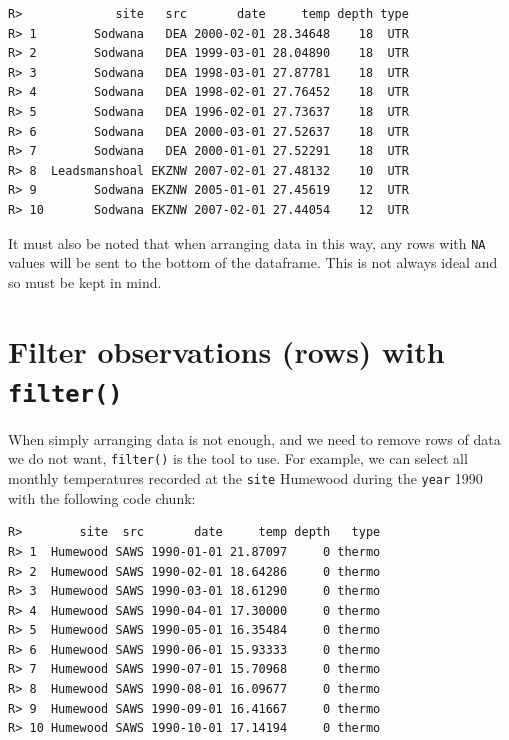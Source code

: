\documentclass[]{book}
\newenvironment{Shaded}{\begin{snugshade}}{\end{snugshade}}
\newcommand{\KeywordTok}[1]{\textcolor[rgb]{0.13,0.29,0.53}{\textbf{#1}}}
\newcommand{\DecValTok}[1]{\textcolor[rgb]{0.00,0.00,0.81}{#1}}
\newcommand{\StringTok}[1]{\textcolor[rgb]{0.31,0.60,0.02}{#1}}
\newcommand{\OperatorTok}[1]{\textcolor[rgb]{0.81,0.36,0.00}{\textbf{#1}}}
\newcommand{\NormalTok}[1]{#1}
\theoremstyle{definition}
\theoremstyle{definition}
\theoremstyle{definition}
\theoremstyle{remark}
\begin{document}
\begin{verbatim}
R>             site   src       date     temp depth type
R> 1        Sodwana   DEA 2000-02-01 28.34648    18  UTR
R> 2        Sodwana   DEA 1999-03-01 28.04890    18  UTR
R> 3        Sodwana   DEA 1998-03-01 27.87781    18  UTR
R> 4        Sodwana   DEA 1998-02-01 27.76452    18  UTR
R> 5        Sodwana   DEA 1996-02-01 27.73637    18  UTR
R> 6        Sodwana   DEA 2000-03-01 27.52637    18  UTR
R> 7        Sodwana   DEA 2000-01-01 27.52291    18  UTR
R> 8  Leadsmanshoal EKZNW 2007-02-01 27.48132    10  UTR
R> 9        Sodwana EKZNW 2005-01-01 27.45619    12  UTR
R> 10       Sodwana EKZNW 2007-02-01 27.44054    12  UTR
\end{verbatim}

It must also be noted that when arranging data in this way, any rows
with \texttt{NA} values will be sent to the bottom of the dataframe.
This is not always ideal and so must be kept in mind.

\section{\texorpdfstring{Filter observations (rows) with
\texttt{filter()}}{Filter observations (rows) with filter()}}\label{filter-observations-rows-with-filter}

When simply arranging data is not enough, and we need to remove rows of
data we do not want, \texttt{filter()} is the tool to use. For example,
we can select all monthly temperatures recorded at the \texttt{site}
Humewood during the \texttt{year} 1990 with the following code chunk:

\begin{Shaded}
\end{Shaded}

\begin{verbatim}
R>        site  src       date     temp depth   type
R> 1  Humewood SAWS 1990-01-01 21.87097     0 thermo
R> 2  Humewood SAWS 1990-02-01 18.64286     0 thermo
R> 3  Humewood SAWS 1990-03-01 18.61290     0 thermo
R> 4  Humewood SAWS 1990-04-01 17.30000     0 thermo
R> 5  Humewood SAWS 1990-05-01 16.35484     0 thermo
R> 6  Humewood SAWS 1990-06-01 15.93333     0 thermo
R> 7  Humewood SAWS 1990-07-01 15.70968     0 thermo
R> 8  Humewood SAWS 1990-08-01 16.09677     0 thermo
R> 9  Humewood SAWS 1990-09-01 16.41667     0 thermo
R> 10 Humewood SAWS 1990-10-01 17.14194     0 thermo
\end{verbatim}
\end{document}
